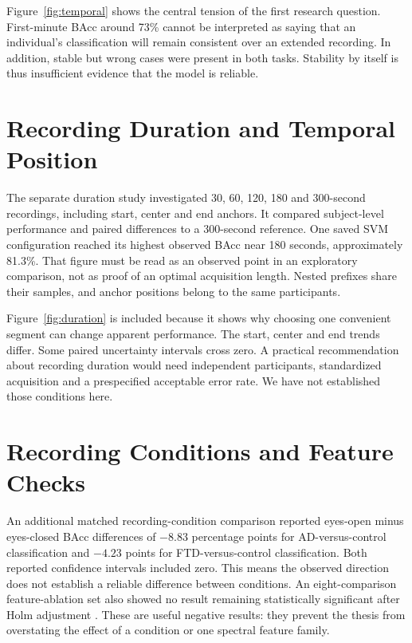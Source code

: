 Figure~\ref{fig:temporal} shows the central tension of the first research question. First-minute BAcc around 73\% cannot be interpreted as saying that an individual's classification will remain consistent over an extended recording. In addition, stable but wrong cases were present in both tasks. Stability by itself is thus insufficient evidence that the model is reliable.

\section{Recording Duration and Temporal Position}
The separate duration study investigated 30, 60, 120, 180 and 300-second recordings, including start, center and end anchors. It compared subject-level performance and paired differences to a 300-second reference. One saved SVM configuration reached its highest observed BAcc near 180 seconds, approximately 81.3\%. That figure must be read as an observed point in an exploratory comparison, not as proof of an optimal acquisition length. Nested prefixes share their samples, and anchor positions belong to the same participants.


Figure~\ref{fig:duration} is included because it shows why choosing one convenient segment can change apparent performance. The start, center and end trends differ. Some paired uncertainty intervals cross zero. A practical recommendation about recording duration would need independent participants, standardized acquisition and a prespecified acceptable error rate. We have not established those conditions here.

\section{Recording Conditions and Feature Checks}
An additional matched recording-condition comparison reported eyes-open minus eyes-closed BAcc differences of $-8.83$ percentage points for AD-versus-control classification and $-4.23$ points for FTD-versus-control classification. Both reported confidence intervals included zero. This means the observed direction does not establish a reliable difference between conditions. An eight-comparison feature-ablation set also showed no result remaining statistically significant after Holm adjustment \cite{holm1979}. These are useful negative results: they prevent the thesis from overstating the effect of a condition or one spectral feature family.

